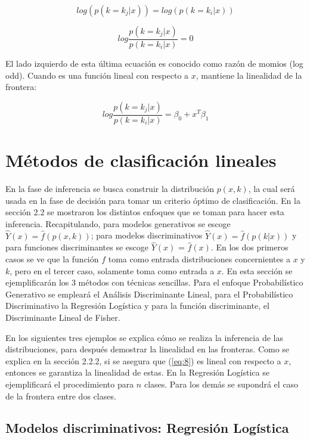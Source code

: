 $$ log(p(k = k_j | x)) = log( p(k = k_i | x)) $$	

\begin{equation} \label{eq:7}
 log \frac{p( k = k_j | x )}{ p(k =  k_i |  x)} = 0 	
\end{equation}

El lado izquierdo de esta última ecuación es conocido como razón de momios (log odd). Cuando es una función lineal con respecto a $x$, mantiene la linealidad de la frontera:

\begin{equation} \label{eq:8}
 log \frac{p(k = k_j | x )}{p(k = k_i |  x)} = \beta_0 + x^T \beta_1 
\end{equation}


\section{Métodos de clasificación lineales}

En la fase de inferencia se busca construir la distribución $p(x,k)$, la cual será usada en la fase de decisión para tomar un criterio óptimo de clasificación. En la sección 2.2 se mostraron los distintos enfoques que se toman para hacer esta inferencia. Recapitulando, para modelos generativos se escoge $\widehat{Y}(x) = \widehat{f}(p(x,k))$; para modelos discriminativos $\widehat{Y}(x) = \widehat{f}(p(k|x))$ y para funciones discriminantes se escoge $\widehat{Y}(x)$ = $\widehat{f}(x)$. En los dos primeros casos se ve que la función $f$ toma como entrada distribuciones concernientes a $x$ y $k$, pero en el tercer caso, solamente toma como entrada a $x$. En esta sección se ejemplificarán los 3 métodos con técnicas sencillas. Para el enfoque Probabilístico Generativo se empleará el Análisis Discriminante Lineal, para el Probabilístico Discriminativo la Regresión Logística y para la función discriminante, el Discriminante Lineal de Fisher.

En los siguientes tres ejemplos se explica cómo se realiza la inferencia de las distribuciones, para después demostrar la linealidad en las fronteras. Como se explica en la sección 2.2.2, si se asegura que (\ref{eq:8}) es lineal con respecto a $x$, entonces se garantiza la linealidad de estas. En la Regresión Logística se ejemplificará el procedimiento para $n$ clases. Para los demás se supondrá el caso de la frontera entre dos clases.


\subsection{Modelos discriminativos: Regresión Logística}


